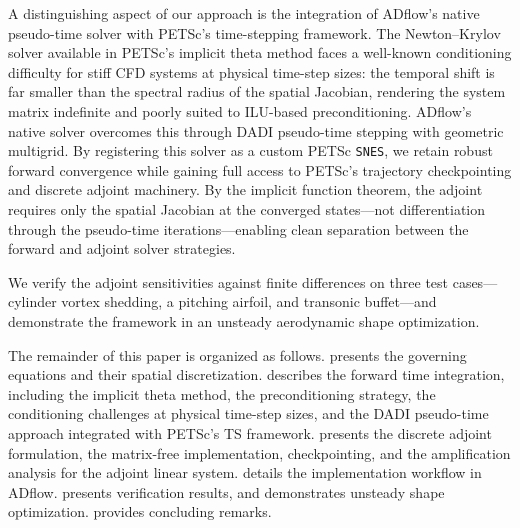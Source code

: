 \documentclass[journal]{new-aiaa}
\begin{document}
A distinguishing aspect of our approach is the integration of ADflow's native pseudo-time solver with PETSc's time-stepping framework.
The Newton--Krylov solver available in PETSc's implicit theta method faces a well-known conditioning difficulty for stiff CFD systems at physical time-step sizes: the temporal shift is far smaller than the spectral radius of the spatial Jacobian, rendering the system matrix indefinite and poorly suited to ILU-based preconditioning.
ADflow's native solver overcomes this through DADI pseudo-time stepping with geometric multigrid.
By registering this solver as a custom PETSc \texttt{SNES}, we retain robust forward convergence while gaining full access to PETSc's trajectory checkpointing and discrete adjoint machinery.
By the implicit function theorem, the adjoint requires only the spatial Jacobian at the converged states---not differentiation through the pseudo-time iterations---enabling clean separation between the forward and adjoint solver strategies.

We verify the adjoint sensitivities against finite differences on three test cases---cylinder vortex shedding, a pitching airfoil, and transonic buffet---and demonstrate the framework in an unsteady aerodynamic shape optimization.

The remainder of this paper is organized as follows.
 presents the governing equations and their spatial discretization.
 describes the forward time integration, including the implicit theta method, the preconditioning strategy, the conditioning challenges at physical time-step sizes, and the DADI pseudo-time approach integrated with PETSc's TS framework.
 presents the discrete adjoint formulation, the matrix-free implementation, checkpointing, and the amplification analysis for the adjoint linear system.
 details the implementation workflow in ADflow.
 presents verification results, and  demonstrates unsteady shape optimization.
 provides concluding remarks.
\end{document}
